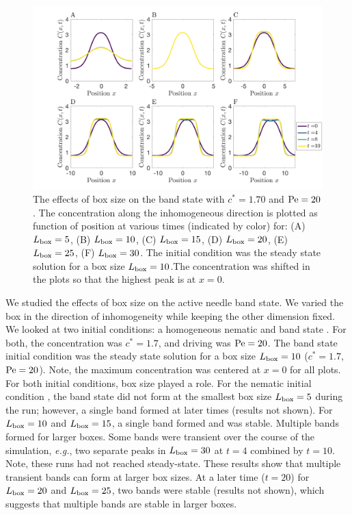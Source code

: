 \begin{figure}[!ht]
	\centering
  \includegraphics[width=1.00\textwidth]{figs/ch05_valid/box_size_compare_band.png}
  \caption[Finite-size effects: band initial condition]
  {The effects of box size on the band state with $c^*=1.70$ and $\text{Pe} = 20$. 
  The concentration along
  the inhomogeneous direction is plotted as function of position
  at various times (indicated by color) for: 
  (A) $L_{\mathrm{box}}=5$, (B) $L_{\mathrm{box}}=10$, (C) $L_{\mathrm{box}}=15$, (D) $L_{\mathrm{box}}=20$, (E)
  $L_{\mathrm{box}}=25$, (F) $L_{\mathrm{box}}=30$. The initial condition was the steady state
  solution for a box size $L_{\mathrm{box}}=10$.The concentration was
  shifted in the plots so that the highest peak is at $x=0$.}\label{fig:box_size_band}
\end{figure}

We studied the effects of box size on the active needle band state. We varied
the box in the direction of inhomogeneity while keeping the other dimension
fixed. We looked at two initial conditions: a homogeneous nematic
 and band state . For both,
the concentration was $c^* = 1.7$, and driving was $\text{Pe} =20$.  The band state
initial condition was the steady state solution for a box size $L_{\mathrm{box}}=10$
($c^* = 1.7$, $\text{Pe} =20$). Note, the maximum concentration was centered at $x=0$
for all plots. For both initial conditions, box size played a role. For the
nematic initial condition , the band state did not form
at the smallest box size $L_{\mathrm{box}}=5$ during the run; however, a single band
formed at later times (results not shown).  For $L_{\mathrm{box}}=10$ and
$L_{\mathrm{box}}=15$, a single band formed and was stable. Multiple bands formed
for larger boxes.  Some bands were transient over the course of the
simulation, \textit{e.g.}, two separate peaks in $L_{\mathrm{box}}=30$ at $t=4$
combined by $t=10$. Note, these runs had not reached steady-state.  These
results show that multiple transient bands can form at larger box sizes. At
a later time ($t=20$) for $L_{\mathrm{box}} = 20$ and $L_{\mathrm{box}} =
25$, two bands were stable (results not shown), which suggests that multiple
bands are stable in larger boxes.

